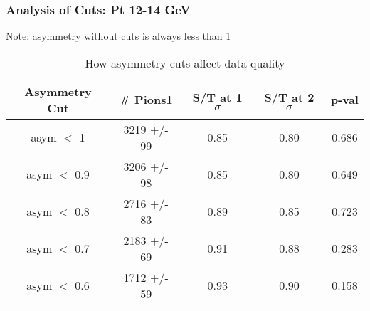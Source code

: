 \frame
{
\frametitle{Analysis of Cuts: Pt 12-14 GeV}
Note: asymmetry without cuts is always less than 1
\begin{table}
\caption{How asymmetry cuts affect data quality}
\centering
\begin{tabular}{c c c c c}
\hline\hline
Asymmetry Cut & \# Pions1 & S/T at 1 $\sigma$ & S/T at 2 $\sigma$ & p-val \\ [0.5ex]
\hline
asym $<$ 1 & 3219 +/-   99 & 0.85 & 0.80 & 0.686 \\ %
asym $<$ 0.9 & 3206 +/-   98 & 0.85 & 0.80 & 0.649 \\ %
asym $<$ 0.8 & 2716 +/-   83 & 0.89 & 0.85 & 0.723 \\ %
asym $<$ 0.7 & 2183 +/-   69 & 0.91 & 0.88 & 0.283 \\ %
asym $<$ 0.6 & 1712 +/-   59 & 0.93 & 0.90 & 0.158 \\ %
[1ex]
\hline
\end{tabular}
\label{table:nonlin}
\end{table}
}
